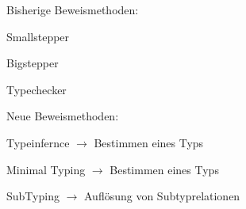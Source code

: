 {
    \begin{itemgroup}{Bisherige Beweismethoden:}
	\item Smallstepper
	\item Bigstepper
	\item Typechecker
	\end{itemgroup}
    
	\begin{itemgroup}{Neue Beweismethoden:}
	\item Typeinfernce $\to$ Bestimmen eines Typs
	\item Minimal Typing $\to$ Bestimmen eines Typs
	\item SubTyping $\to$ Auflösung von Subtyprelationen
	\end{itemgroup}
  
}